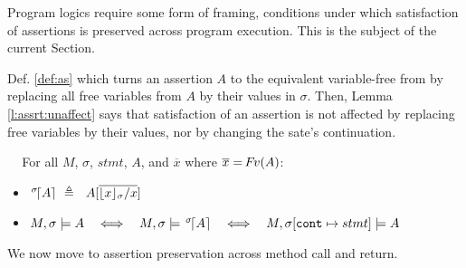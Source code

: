 Program logics require some form of framing, \ie conditions under which  satisfaction of  assertions is preserved across program execution. 
This is the subject of the current Section.

Def. \ref{def:as} which turns an assertion  $A$ %
to the equivalent variable-free from by replacing all free variables from $A$ by their values in $\sigma$. %
 Then,   Lemma \ref{l:assrt:unaffect}  says  that 
satisfaction of an assertion is not affected by replacing free  variables by their values, nor by changing the sate's continuation.

\begin{definitionAndLemma} $ $ ~
\label{def:as}
\label{lemma:addr:expr}
\label{l:assrt:unaffect}
For all $M$, $\sigma$,  $stmt$,   $A$, and $\overline x$ where  $\overline x = {\hspace{-1pt}F\hspace{-1pt}}v{(A)}$:

\begin{itemize}  
\item

${\as  \sigma A} \ \triangleq \ \ A[\overline {{\interpret {\sigma} {x}}/x}]$\  
\item
$\satisfiesA{M}{\sigma}{A}   \ \ \ \Longleftrightarrow\ \ \ \satisfiesA{M}{\sigma}{{\as {\sigma} A} }    \ \ \ \Longleftrightarrow\ \ \  \satisfiesA{M}{\sigma[\prg{cont}\mapsto stmt]}{A}$ 
\end{itemize}
\end{definitionAndLemma}

%
%
%

 \noindent
We now move to assertion preservation across method call and return.  


